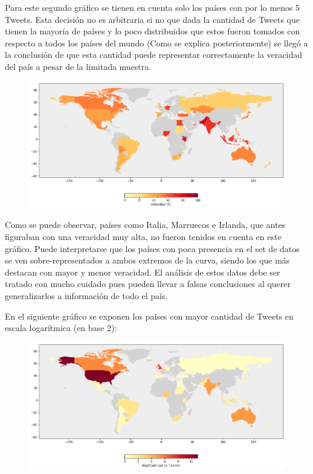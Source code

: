 \documentclass[titlepage,a4paper]{article}
\begin{document}
    Para este segundo gráfico se tienen en cuenta solo los países con por lo menos 5 Tweets. Esta decisión no es arbitraria si no que dada la cantidad de Tweets que tienen la mayoría de países y lo poco distribuidos que estos fueron tomados con respecto a todos los países del mundo (Como se explica posteriormente) se llegó a la conclusión de que esta cantidad puede representar correctamente la veracidad del país a pesar de la limitada muestra.
    
    \begin{figure}[H]
    \raggedleft
    \includegraphics[width=1.1\textwidth]{graficos/Analisis de Locacion/map2.png}
    \caption{}
    \end{figure}  
    
    Como se puede observar, países como Italia, Marruecos e Irlanda, que antes figuraban con una veracidad muy alta, no fueron tenidos en cuenta en este gráfico. Puede interpretarse que los países con poca presencia en el set de datos se ven sobre-representados a ambos extremos de la curva, siendo los que más destacan con mayor y menor veracidad. El análisis de estos datos debe ser tratado con mucho cuidado pues pueden llevar a falsas conclusiones al querer generalizarlos a información de todo el país.
    
    En el siguiente gráfico se exponen los países con mayor cantidad de Tweets en escala logarítmica (en base 2):
    
    \begin{figure}[H]
    \centering
    \includegraphics[width=1\textwidth]{graficos/Analisis de Locacion/map_cantidad_tweets.png}
    \caption{}
    \end{figure}
    
\end{document}
